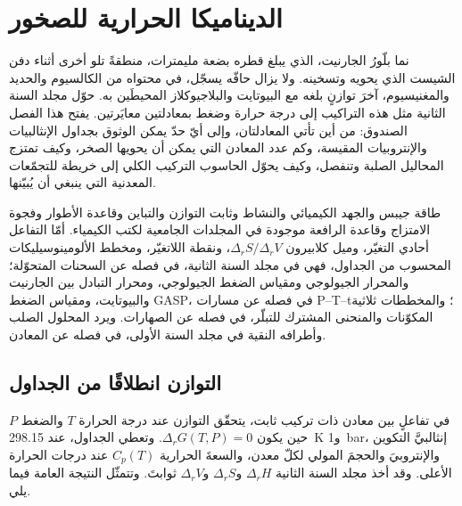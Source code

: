 \chapter{الديناميكا الحرارية للصخور}\label{ch:b3:petrological-thermodynamics}

نما بلّورُ الجارنيت، الذي يبلغ قطره بضعة مليمترات، منطقةً تلو أخرى أثناء دفن الشيست الذي يحويه وتسخينه.
ولا يزال حافّه يسجّل، في محتواه من الكالسيوم والحديد والمغنيسيوم،
آخرَ توازنٍ بلغه مع البيوتايت والبلاجيوكلاز المحيطَين به.
حوّل مجلد السنة الثانية مثل هذه التراكيب إلى درجة حرارة وضغط
بمعادلتين معايَرتين. يفتح هذا الفصل الصندوق: من أين تأتي المعادلتان،
وإلى أيّ حدّ يمكن الوثوق بجداول الإنثالبيات والإنتروبيات المقيسة،
وكم عدد المعادن التي يمكن أن يحويها الصخر، وكيف تمتزج المحاليل الصلبة وتنفصل،
وكيف يحوّل الحاسوب التركيب الكلي إلى خريطة للتجمّعات
المعدنية التي ينبغي أن يُبيّنها.

\begin{recall}
طاقة جيبس والجهد الكيميائي والنشاط وثابت التوازن
والتباين وقاعدة الأطوار وفجوة الامتزاج وقاعدة الرافعة
موجودة في المجلدات الجامعية لكتب الكيمياء. أمّا التفاعل أحادي التغيّر،
وميل كلابيرون $\Delta_rS/\Delta_rV$، ونقطة اللاتغيّر، ومخطط الألومينوسيليكات
المحسوب من الجداول، فهي في مجلد السنة الثانية، في فصله عن السحنات المتحوّلة؛
والمحرار الجيولوجي ومقياس الضغط الجيولوجي، ومحرار التبادل بين الجارنيت والبيوتايت،
ومقياس الضغط GASP، في فصله عن مسارات P--T--t؛
والمخططات ثلاثية المكوّنات والمنحنى المشترك للتبلّر، في فصله عن الصهارات. ويرد
المحلول الصلب وأطرافه النقية في مجلد السنة الأولى، في فصله عن
المعادن.
\end{recall}

\section{التوازن انطلاقًا من الجداول}\label{sec:b3:petrological-thermodynamics:tables}

في تفاعلٍ بين معادن ذات تركيب ثابت، يتحقّق التوازن عند درجة الحرارة
$T$ والضغط $P$ حين يكون $\Delta_rG(T, P) = 0$. وتعطي الجداول، عند
\qty{298.15}{K} و\qty{1}{bar}، إنثالبيَّ التكوين والإنتروبيَ والحجمَ المولي لكلّ معدن،
والسعةَ الحرارية $C_p(T)$ عند درجات الحرارة الأعلى. وقد أخذ مجلد السنة الثانية
$\Delta_rH$ و$\Delta_rS$ و$\Delta_rV$ ثوابتَ. وتتمثّل
النتيجة العامة فيما يلي.

